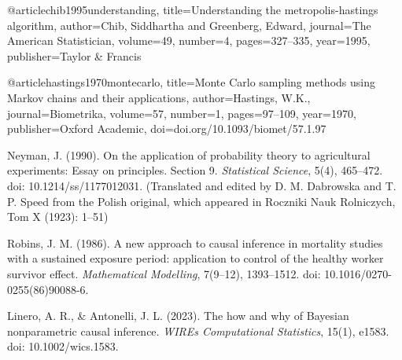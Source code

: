 @article{chib1995understanding,
  title={Understanding the metropolis-hastings algorithm},
  author={Chib, Siddhartha and Greenberg, Edward},
  journal={The American Statistician},
  volume={49},
  number={4},
  pages={327--335},
  year={1995},
  publisher={Taylor \& Francis}
}





@article{hastings1970montecarlo,
  title={Monte Carlo sampling methods using Markov chains and their applications},
  author={Hastings, W.K.},
  journal={Biometrika},
  volume={57},
  number={1},
  pages={97--109},
  year={1970},
  publisher={Oxford Academic},
  doi={doi.org/10.1093/biomet/57.1.97}
}





































Neyman, J. (1990).
On the application of probability theory to agricultural experiments: Essay on principles. Section 9.
\textit{Statistical Science}, 5(4), 465--472.
doi: 10.1214/ss/1177012031.
(Translated and edited by D. M. Dabrowska and T. P. Speed from the Polish original, which appeared in Roczniki Nauk Rolniczych, Tom X (1923): 1–51)











Robins, J. M. (1986).
A new approach to causal inference in mortality studies with a sustained exposure period: application to control of the healthy worker survivor effect.
\textit{Mathematical Modelling}, 7(9--12), 1393--1512.
doi: 10.1016/0270-0255(86)90088-6.



Linero, A. R., \& Antonelli, J. L. (2023).
The how and why of Bayesian nonparametric causal inference.
\textit{WIREs Computational Statistics}, 15(1), e1583.
doi: 10.1002/wics.1583.




